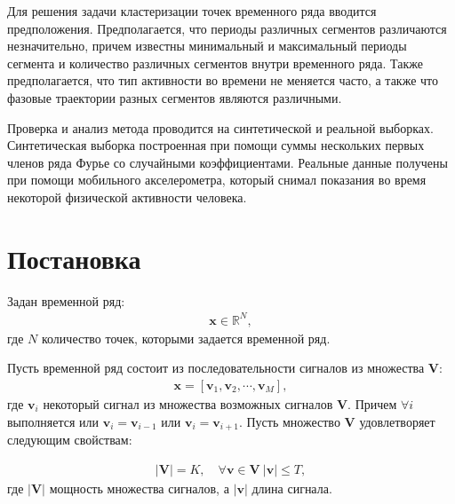 \documentclass[12pt, twoside]{article}
\numberwithin{equation}{section}
\begin{document}
Для решения задачи кластеризации точек временного ряда вводится предположения. Предполагается, что периоды различных сегментов различаются незначительно, причем известны минимальный и максимальный периоды сегмента и количество различных сегментов внутри временного ряда. Также предполагается, что тип активности во времени не меняется часто, а также что фазовые траектории разных сегментов являются различными. 

Проверка и анализ метода проводится на синтетической и реальной выборках. Синтетическая выборка построенная при помощи суммы нескольких первых членов ряда Фурье со случайными коэффициентами. Реальные данные получены при помощи мобильного акселерометра, который снимал показания во время некоторой физической активности человека.



\section{Постановка}

Задан временной ряд:
\begin{equation}
\label{eq:st:1}
\begin{aligned}
\textbf{x} \in \mathbb{R}^{N},
\end{aligned}
\end{equation}
где $N$ количество точек, которыми задается временной ряд.

Пусть временной ряд состоит из последовательности сигналов из множества $\mathbf{V}$:
\begin{equation}
\label{eq:st:2}
\begin{aligned}
\textbf{x} = [\textbf{v}_1, \textbf{v}_2, \cdots, \textbf{v}_M],
\end{aligned}
\end{equation}
где $\textbf{v}_i$ некоторый сигнал из множества возможных сигналов $\mathbf{V}$. Причем $\forall i$ выполняется или $\textbf{v}_i = \textbf{v}_{i-1}$ или   $\textbf{v}_i = \textbf{v}_{i+1}$. Пусть множество $\mathbf{V}$ удовлетворяет следующим свойствам:

\begin{equation}
\label{eq:st:3}
\begin{aligned}
\left|\mathbf{V}\right| = K, \quad \forall \textbf{v} \in \mathbf{V}~\left|\textbf{v}\right| \leq T,
\end{aligned}
\end{equation}
где $\left|\mathbf{V}\right|$ мощность множества сигналов, а $\left|\textbf{v}\right|$ длина сигнала.
\end{document}
